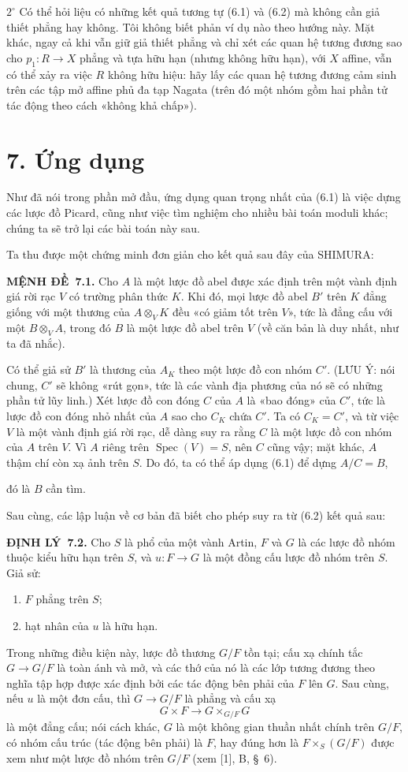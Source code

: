 \documentclass[11pt,twoside,openany]{book}
\numberwithin{equation}{section}
\newcommand{\src}[1]{%
  \phantomsection\hypertarget{src:\fgasourceid:#1}{}%
  \marginpar{\raggedleft\footnotesize\sffamily #1}%
}
\newcommand{\fgasourceid}{unset}
\newcommand{\fsection}[2]{%
  \section*{#1. #2}%
  \addcontentsline{toc}{section}{#1. #2}%
}
\newcommand{\result}[2]{\par\medskip\noindent\textbf{#1\if\relax\detokenize{#2}\relax\else\ #2\fi.}\quad}
\begin{document}
\smallskip
\noindent $2^\circ$ Có thể hỏi liệu có những kết quả tương tự (6.1) và (6.2)
mà không cần giả thiết phẳng hay không. Tôi không biết phản ví dụ nào theo
hướng này. Mặt khác, ngay cả khi vẫn giữ giả thiết phẳng và chỉ xét các quan
hệ tương đương sao cho $p_1:R\to X$ phẳng và tựa hữu hạn (nhưng không hữu
hạn), với $X$ affine, vẫn có thể xảy ra việc $R$ không hữu hiệu: hãy lấy các
quan hệ tương đương cảm sinh trên các tập mở affine phủ đa tạp Nagata (trên đó
một nhóm gồm hai phần tử tác động theo cách «không khả chấp»).

\fsection{7}{Ứng dụng}

Như đã nói trong phần mở đầu, ứng dụng quan trọng nhất của (6.1) là việc dựng
các lược đồ Picard, cũng như việc tìm nghiệm cho nhiều bài toán moduli khác;
chúng ta sẽ trở lại các bài toán này sau.

Ta thu được một chứng minh đơn giản cho kết quả sau đây của SHIMURA:

\result{MỆNH ĐỀ}{7.1} Cho $A$ là một lược đồ abel được xác định trên một vành
định giá rời rạc $V$ có trường phân thức $K$. Khi đó, mọi lược đồ abel $B'$
trên $K$ đẳng giống với một thương của $A\otimes_V K$ đều «có giảm tốt trên
$V$», tức là đẳng cấu với một $B\otimes_V A$, trong đó $B$ là
một lược đồ abel trên $V$ (về căn bản là duy nhất, như ta đã nhắc).

Có thể giả sử $B'$ là thương của $A_K$ theo một lược đồ con nhóm $C'$.
(LƯU Ý: nói chung, $C'$ sẽ không «rút gọn», tức là các vành địa phương của nó
sẽ có những phần tử lũy linh.) Xét lược đồ con đóng $C$ của $A$ là «bao đóng»
của $C'$, tức là lược đồ con đóng nhỏ nhất của $A$ sao cho $C_K$ chứa $C'$.
Ta có $C_K=C'$, và từ việc $V$ là một vành định giá rời rạc, dễ dàng suy ra
rằng $C$ là một lược đồ con nhóm của $A$ trên $V$. Vì $A$ riêng trên
$\operatorname{Spec}(V)=S$, nên $C$ cũng vậy; mặt khác, $A$ thậm chí còn xạ
ảnh trên $S$. Do đó, ta có thể áp dụng (6.1) để dựng $A/C=B$,
\src{115}
đó là $B$ cần tìm.

Sau cùng, các lập luận về cơ bản đã biết cho phép suy ra từ (6.2) kết quả sau:

\result{ĐỊNH LÝ}{7.2} Cho $S$ là phổ của một vành Artin, $F$ và $G$ là các
lược đồ nhóm thuộc kiểu hữu hạn trên $S$, và $u:F\to G$ là một đồng cấu lược
đồ nhóm trên $S$. Giả sử:
\begin{enumerate}
\item[(i)] $F$ phẳng trên $S$;
\item[(ii)] hạt nhân của $u$ là hữu hạn.
\end{enumerate}
Trong những điều kiện này, lược đồ thương $G/F$ tồn tại; cấu xạ chính tắc
$G\to G/F$ là toàn ánh và mở, và các thớ của nó là các lớp tương đương theo
nghĩa tập hợp được xác định bởi các tác động bên phải của $F$ lên $G$. Sau
cùng, nếu $u$ là một đơn cấu, thì $G\to G/F$ là phẳng và cấu xạ
\[
  G\times F\longrightarrow G\times_{G/F}G
\]
là một đẳng cấu; nói cách khác, $G$ là một không gian thuần nhất chính trên
$G/F$, có nhóm cấu trúc (tác động bên phải) là $F$, hay đúng hơn là
$F\times_S(G/F)$ được xem như một lược đồ nhóm trên $G/F$ (xem [1], B,
\S~6).
\end{document}
